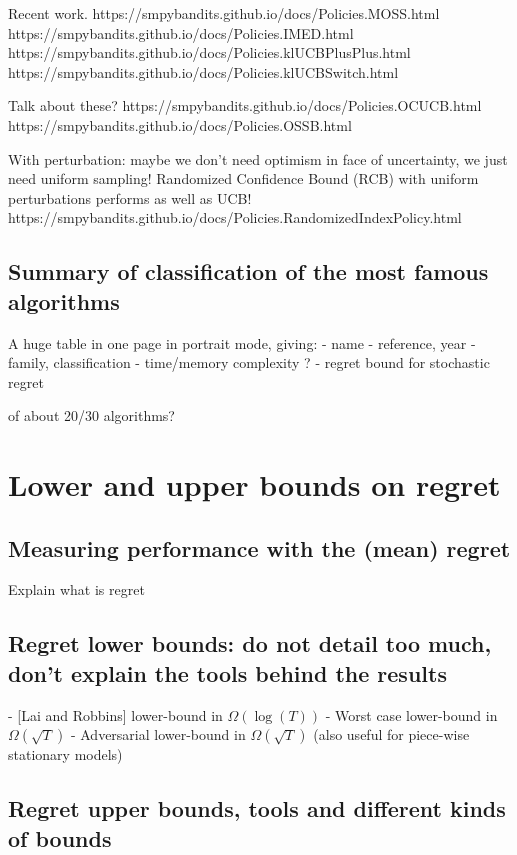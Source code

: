 Recent work.
https://smpybandits.github.io/docs/Policies.MOSS.html
https://smpybandits.github.io/docs/Policies.IMED.html
https://smpybandits.github.io/docs/Policies.klUCBPlusPlus.html
https://smpybandits.github.io/docs/Policies.klUCBSwitch.html

Talk about these?
https://smpybandits.github.io/docs/Policies.OCUCB.html
https://smpybandits.github.io/docs/Policies.OSSB.html

With perturbation: maybe we don't need optimism in face of uncertainty, we just need uniform sampling!
Randomized Confidence Bound (RCB) with uniform perturbations performs as well as UCB!
https://smpybandits.github.io/docs/Policies.RandomizedIndexPolicy.html


\subsection{Summary of classification of the most famous algorithms}

A huge table in one page in portrait mode, giving:
- name
- reference, year
- family, classification
- time/memory complexity ?
- regret bound for stochastic regret

of about 20/30 algorithms?


\section{Lower and upper bounds on regret}
\label{sec:2:lowerUpperBoundsRegret}


\subsection{Measuring performance with the (mean) regret}
Explain what is regret


\subsection{Regret lower bounds: do not detail too much, don't explain the tools behind the results}

- [Lai and Robbins] lower-bound in $\Omega(\log(T))$
- Worst case lower-bound in $\Omega(\sqrt{T})$
- Adversarial lower-bound in $\Omega(\sqrt{T})$ (also useful for piece-wise stationary models)


\subsection{Regret upper bounds, tools and different kinds of bounds}

